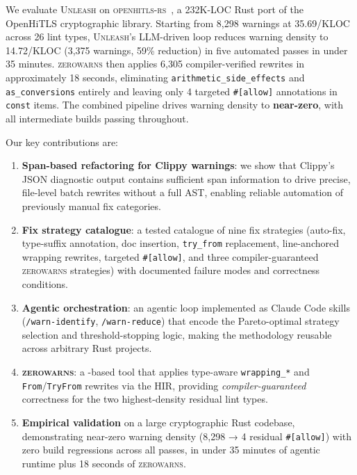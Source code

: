 \documentclass[sigconf,review,anonymous]{acmart}
\newcommand{\tool}{\textsc{Unleash}\xspace}
\newcommand{\zerowarns}{\textsc{zerowarns}\xspace}
\newcommand{\tcode}{\path}
\begin{document}
We evaluate \tool on \textsc{openhitls-rs}~\cite{openhitls}, a 232K-LOC Rust
port of the OpenHiTLS cryptographic library.
Starting from 8,298 warnings at 35.69/KLOC across 26 lint types, \tool's
LLM-driven loop reduces warning density to 14.72/KLOC (3,375 warnings, 59\%
reduction) in five automated passes in under 35 minutes.
\zerowarns then applies 6,305 compiler-verified rewrites in approximately 18
seconds, eliminating \texttt{arithmetic\_side\_effects} and
\texttt{as\_conversions} entirely and leaving only 4 targeted
\texttt{\#[allow]} annotations in \texttt{const} items.
The combined pipeline drives warning density to \textbf{near-zero}, with all
intermediate builds passing throughout.

Our key contributions are:
\begin{enumerate}
  \item \textbf{Span-based refactoring for Clippy warnings}: we show that
    Clippy's JSON diagnostic output contains sufficient span information
    to drive precise, file-level batch rewrites without a full AST, enabling
    reliable automation of previously manual fix categories.

  \item \textbf{Fix strategy catalogue}: a tested catalogue of nine fix
    strategies (auto-fix, type-suffix annotation, doc insertion,
    \texttt{try\_from} replacement, line-anchored wrapping rewrites,
    targeted \texttt{\#[allow]}, and three compiler-guaranteed \zerowarns
    strategies) with documented failure modes and correctness conditions.

  \item \textbf{Agentic orchestration}: an agentic loop implemented as
    Claude Code skills (\texttt{/warn-identify}, \texttt{/warn-reduce}) that
    encode the Pareto-optimal strategy selection and threshold-stopping logic,
    making the methodology reusable across arbitrary Rust projects.

  \item \textbf{\zerowarns}: a \tcode{RUSTC\_WRAPPER}-based tool that applies
    type-aware \texttt{wrapping\_*} and \texttt{From}/\texttt{TryFrom} rewrites
    via the HIR, providing \emph{compiler-guaranteed} correctness for the two
    highest-density residual lint types.

  \item \textbf{Empirical validation} on a large cryptographic Rust codebase,
    demonstrating near-zero warning density (8,298 → 4 residual
    \texttt{\#[allow]}) with zero build regressions across all passes,
    in under 35 minutes of agentic runtime plus 18 seconds of \zerowarns.
\end{enumerate}
\end{document}
